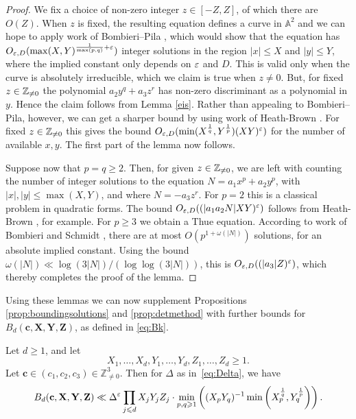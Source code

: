 \begin{proof}
We fix  a choice of non-zero integer $z\in [-Z,Z]$, of which there are $O(Z)$.   When $z$ is fixed, the resulting equation defines a curve in $\mathbb{A}^2$ and we can hope to apply work of Bombieri--Pila \cite[Theorem~4]{bp}, which would show that the equation has $O_{\varepsilon,D}(\max(X,Y)^{\frac{1}{\max(p,q)}+\varepsilon})$ integer solutions in the region $|x|\leq X$ and $|y|\leq Y$, where the implied constant only depends on $\varepsilon$ and $D$. This is valid only when
the curve is absolutely irreducible, which we claim is true when $z\neq 0$. But, for fixed $z\in \mathbb{Z}_{\neq 0}$ the
polynomial $a_2y^q+a_3z^r$ has non-zero discriminant as a polynomial in $y$. Hence the claim follows from Lemma \ref{eis}. Rather than appealing to Bombieri--Pila, however,  we can get a sharper bound by using work of
 Heath-Brown \cite[Theorem 15]{cime}. For fixed $z\in \mathbb{Z}_{\neq 0}$ this gives the bound
 $O_{\varepsilon,D}(\min(X^{\frac{1}{q}},Y^{\frac{1}{p}})(XY)^\varepsilon)$ for the number of available $x,y$.
 The first part of the lemma now follows.

 Suppose now that $p=q\geq 2$. Then, for given  $z\in \mathbb{Z}_{\neq 0}$, we are left with counting the number of integer solutions to the equation $N=a_1x^p+a_2y^p$, with $|x|,|y|\leq \max(X,Y)$, and
 where $N=-a_3z^r$. For $p=2$ this is a classical problem in quadratic forms. The
bound $O_{\varepsilon,D}((|a_1a_2N|XY)^\varepsilon)$ follows from Heath-Brown \cite[Theorem~3]{cubic}, for example.
 For $p\geq 3$ we obtain a Thue equation. According to  work of Bombieri and Schmidt \cite{bs}, there  are at most $O(p^{1+\omega(|N|)})$ solutions, for an absolute  implied constant. Using the bound $\omega(|N|)\ll \log(3|N|)/(\log \log(3|N|))$, this is  $O_{\varepsilon,D}((|a_3|Z)^\varepsilon)$, which thereby completes the proof of the lemma.
  \end{proof}


Using these lemmas we can now  supplement Propositions \ref{prop:boundingsolutions}
and \ref{prop:detmethod} with  further bounds
for  $B_d(\mathbf{c},\mathbf{X},\mathbf{Y},\mathbf{Z})$, as defined in  \eqref{eq:Bk}.


\begin{proposition} \label{prop:det}
Let $d\geq 1$, and let
$$
X_1,\ldots, X_d, Y_1,\ldots, Y_d,Z_1,\ldots, Z_d\geq 1.
$$
Let $\mathbf{c}\in (c_1,c_2,c_3)\in \mathbb{Z}_{\neq 0}^3$.
Then for $\Delta$ as in~\eqref{eq:Delta}, we have
$$
B_d(\mathbf{c},\mathbf{X},\mathbf{Y},\mathbf{Z})  \ll
\Delta^\varepsilon \prod_{j\leqslant d} X_jY_jZ_j \cdot
\min_{p,q\geqslant 1}\left(
(X_pY_q)^{-1}
\min\left( X_p^{\frac{1}{q}} , Y_q^{\frac{1}{p}}\right)\right).
$$
\end{proposition}


